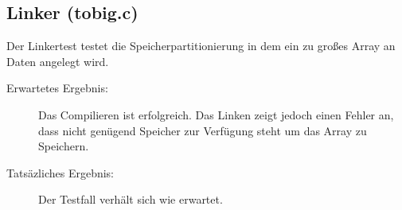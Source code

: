         \subsection{Linker (tobig.c)}
            Der Linkertest testet die Speicherpartitionierung in dem ein zu großes
            Array an Daten angelegt wird.

            \begin{description}
                \item[Erwartetes Ergebnis:] Das Compilieren ist erfolgreich.
                Das Linken zeigt jedoch einen Fehler an, dass nicht genügend Speicher
                zur Verfügung steht um das Array zu Speichern. 
                \item[Tatsäzliches Ergebnis:] Der Testfall verhält sich wie erwartet.
            \end{description}


